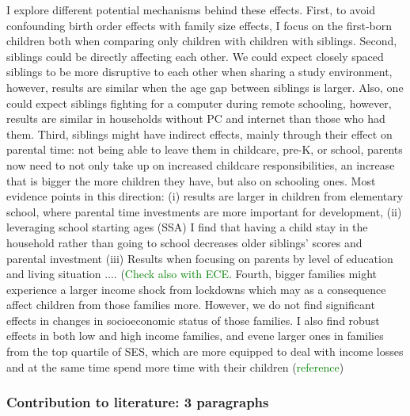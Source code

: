 I explore different potential mechanisms behind these effects. First, to avoid confounding birth order effects with family size effects, I focus on the first-born children both when comparing only children with children with siblings. Second, siblings could be directly affecting each other. We could expect closely spaced siblings to be more disruptive to each other when sharing a study environment, however, results are similar when the age gap between siblings is larger. Also, one could expect siblings fighting for a computer during remote schooling, however, results are similar in households without PC and internet than those who had them. Third, siblings might have indirect effects, mainly through their effect on parental time: not being able to leave them in childcare, pre-K, or school, parents now need to not only take up on increased childcare responsibilities, an increase that is bigger the more children they have, but also on schooling ones. Most evidence points in this direction: (i) results are larger in children from elementary school, where parental time investments are more important for development, (ii) leveraging school starting ages (SSA) I find that having a child stay in the household rather than going to school decreases older siblings' scores and parental investment (iii) Results when focusing on parents by level of education and living situation .... (\textcolor{green}{Check also with ECE}. Fourth, bigger families might experience a larger income shock from lockdowns which may as a consequence affect children from those families more. However, we do not find significant effects in changes in socioeconomic status of those families. I also find robust effects in both low and high income families, and evene larger ones in families from the top quartile of SES, which are more equipped to deal with income losses and at the same time spend more time with their children (\textcolor{green}{reference})


\subsubsection{Contribution to literature: 3 paragraphs}




